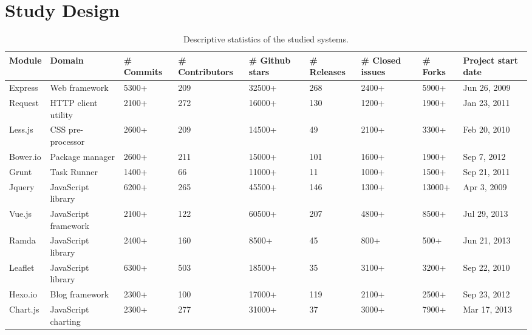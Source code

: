 \section{Study Design}\label{setup}

\begin{table*}[!htbp]
\centering
\scriptsize
\caption{Descriptive statistics of the studied systems.}
\label{studiedsystems}
\begin{tabular}{l|l|l|l|l|l|l|l|l}
\hline
\textbf{Module}   & \textbf{Domain}              		& \textbf{\# Commits} & \textbf{\# Contributors} & \textbf{\# Github stars} & \textbf{\# Releases} & \textbf{\# Closed issues} & \textbf{\# Forks} & \textbf{Project start date}     \\ \hline
Express  & Web framework       		& 5300+      & 209             & 32500+          & 268         & 2400+            & 5900+    & Jun 26, 2009       	   \\ \hline
Request  & HTTP client utility 		& 2100+      & 272             & 16000+          & 130         & 1200+            & 1900+	 & Jan 23, 2011           \\ \hline
Less.js  & CSS pre-processor   		& 2600+      & 209             & 14500+          & 49          & 2100+			  & 3300+	 & Feb 20, 2010           \\ \hline
Bower.io	 & Package manager     		& 2600+      & 211             & 15000+          & 101         & 1600+ 		      & 1900+ 	 & Sep 7, 2012            \\ \hline
Grunt    & Task Runner         		& 1400+      & 66              & 11000+          & 11          & 1000+ 			  & 1500+ 	 & Sep 21, 2011           \\ \hline
Jquery	 & JavaScript library  		& 6200+		 & 265			   & 45500+			 & 146		   & 1300+			  & 13000+	 & Apr 3, 2009			   \\ \hline
Vue.js   & JavaScript framework		& 2100+		 & 122			   & 60500+			 & 207		   & 4800+			  & 8500+	 & Jul 29, 2013		   \\ \hline
Ramda 	 & JavaScript library		& 2400+		 & 160			   & 8500+			 & 45		   & 800+			  & 500+	 & Jun 21, 2013		   \\ \hline
Leaflet	 & JavaScript library		& 6300+		 & 503			   & 18500+			 & 35 		   & 3100+			  & 3200+	 & Sep 22, 2010		   \\ \hline
Hexo.io	 & Blog framework			& 2300+		 & 100			   & 17000+			 & 119		   & 2100+			  & 2500+	 & Sep 23, 2012		   \\ \hline
Chart.js	 & JavaScript charting		& 2300+ 	 & 277			   & 31000+			 & 37		   & 3000+			  & 7900+	 & Mar 17, 2013		   \\ \hline

\end{tabular}
\end{table*}
